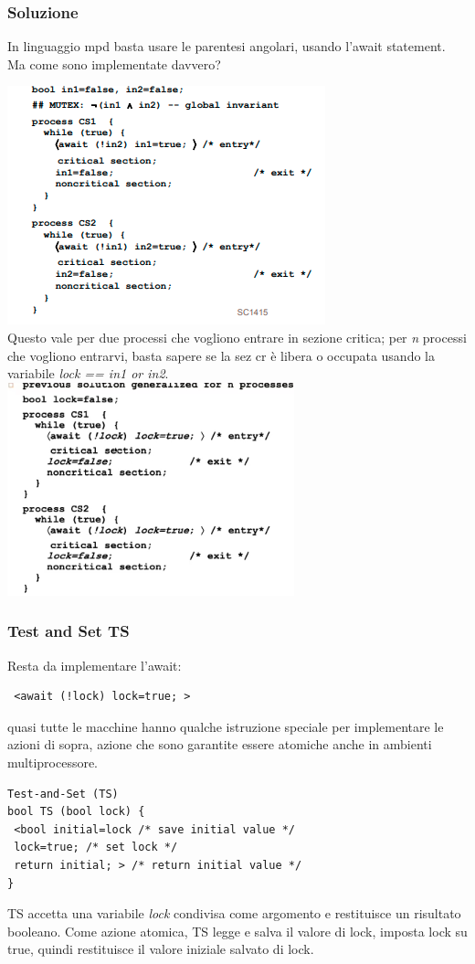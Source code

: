 \documentclass[10pt,a4paper]{article}
\begin{document}
\subsubsection{Soluzione}
In linguaggio mpd basta usare le parentesi angolari, usando l'await statement. Ma come sono implementate davvero?

\includegraphics[scale=1]{img/cs.png} \\
Questo vale per due processi che vogliono entrare in sezione critica; per \textit{n} processi che vogliono entrarvi, basta sapere se la sez cr è libera o occupata usando la variabile \textit{lock == in1 or in2}.\\

\includegraphics[scale=1]{img/cs2.png} \\

\subsubsection{Test and Set TS}
Resta da implementare l'await: \begin{verbatim} <await (!lock) lock=true; >\end{verbatim}

quasi tutte le macchine hanno qualche istruzione speciale per implementare le azioni di sopra, azione che sono garantite essere atomiche anche in ambienti multiprocessore.
\begin{verbatim}
Test-and-Set (TS)
bool TS (bool lock) {
 <bool initial=lock /* save initial value */
 lock=true; /* set lock */
 return initial; > /* return initial value */
}
\end{verbatim}
TS accetta una variabile \textit{lock} condivisa come argomento e restituisce un risultato booleano. Come azione atomica, TS legge e salva il valore di lock, imposta lock su true, quindi restituisce il valore iniziale salvato di lock. 
\end{document}
